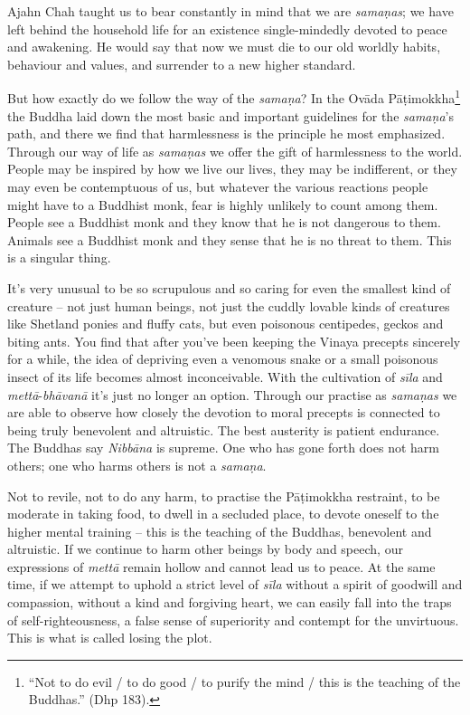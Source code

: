 
Ajahn Chah taught us to bear constantly in mind that we are
\emph{samaṇas}; we have left behind the household life for an existence
single-mindedly devoted to peace and awakening. He would say that now we
must die to our old worldly habits, behaviour and values, and surrender
to a new higher standard. 

But how exactly do we follow the way of the \emph{samaṇa}? In the
Ovāda Pāṭimokkha\footnote{``Not to do evil / to do good / to purify
the mind / this is the teaching of the Buddhas.'' (Dhp 183).} the Buddha laid
down the most basic and important guidelines for the \emph{samaṇa}'s
path, and there we find that harmlessness is the principle he most
emphasized. Through our way of life as \emph{samaṇas} we offer the gift
of harmlessness to the world. People may be inspired by how we live our
lives, they may be indifferent, or they may even be contemptuous of us, 
but whatever the various reactions people might have to a Buddhist monk, 
fear is highly unlikely to count among them. People see a Buddhist monk
and they know that he is not dangerous to them. Animals see a Buddhist
monk and they sense that he is no threat to them. This is a singular
thing. 

It's very unusual to be so scrupulous and so caring for even the
smallest kind of creature -- not just human beings, not just the cuddly
lovable kinds of creatures like Shetland ponies and fluffy cats, but
even poisonous centipedes, geckos and biting ants. You find that after
you've been keeping the Vinaya precepts sincerely for a while, the idea
of depriving even a venomous snake or a small poisonous insect of its
life becomes almost inconceivable. With the cultivation of \emph{sīla}
and \emph{mettā}-\emph{bhāvanā} it's just no longer an option. Through
our practise as \emph{samaṇas} we are able to observe how closely the
devotion to moral precepts is connected to being truly benevolent and
altruistic. The best austerity is patient endurance. The Buddhas say
\emph{Nibbāna} is supreme. One who has gone forth does not harm others; 
one who harms others is not a \emph{samaṇa}. 

Not to revile, not to do any harm, to practise the Pāṭimokkha restraint, 
to be moderate in taking food, to dwell in a secluded place, to devote
oneself to the higher mental training -- this is the teaching of the
Buddhas, benevolent and altruistic. If we continue to harm other beings
by body and speech, our expressions of \emph{mettā} remain hollow and
cannot lead us to peace. At the same time, if we attempt to uphold a
strict level of \emph{sīla} without a spirit of goodwill and compassion, 
without a kind and forgiving heart, we can easily fall into the traps of
self-righteousness, a false sense of superiority and contempt for the
unvirtuous. This is what is called losing the plot. 


